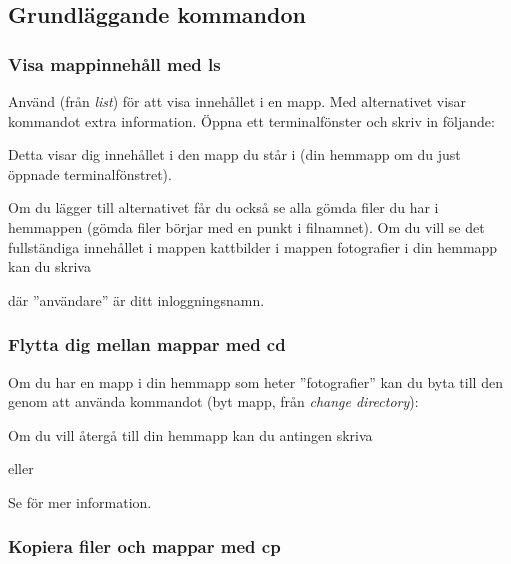 \documentclass[a4paper,final]{memoir} %
\begin{document}
\subsection{Grundläggande kommandon}

\subsubsection{Visa mappinnehåll med ls}\label{sec:ls} 

Använd  (från \textit{list}) för att visa innehållet i en mapp. Med alternativet  visar kommandot extra information. Öppna ett terminalfönster och skriv in följande:


Detta visar dig innehållet i den mapp du står i (din hemmapp om du just öppnade terminalfönstret).

Om du lägger till alternativet  får du också se alla gömda filer du har i hemmappen (gömda filer börjar med en punkt i filnamnet). Om du vill se det fullständiga innehållet i mappen kattbilder i mappen fotografier i din hemmapp kan du skriva


där ''användare'' är ditt inloggningsnamn.

\subsubsection{Flytta dig mellan mappar med cd}\label{sec:cd} 

Om du har en mapp i din hemmapp som heter ''fotografier'' kan du byta till den genom att använda kommandot  (byt mapp, från \textit{change directory}):


Om du vill återgå till din hemmapp kan du antingen skriva 


eller


Se  för mer information.

\subsubsection{Kopiera filer och mappar med cp}\label{sec:cp} 
\end{document}
